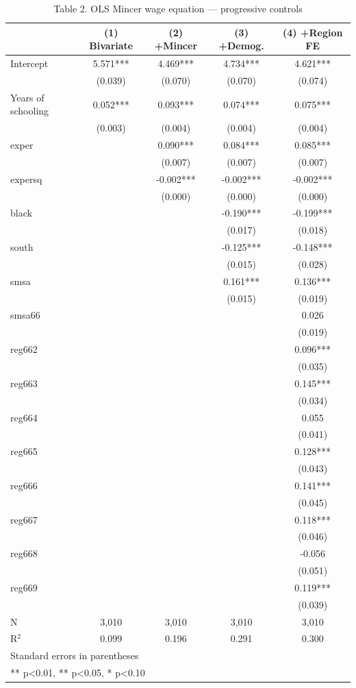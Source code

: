 \begin{table}[htbp]
\centering
\caption{Table 2. OLS Mincer wage equation — progressive controls}
\begin{tabular}{lcccc}
\hline\hline
 & (1) Bivariate & (2) +Mincer & (3) +Demog. & (4) +Region FE \\
\hline
Intercept & 5.571*** & 4.469*** & 4.734*** & 4.621*** \\
 & (0.039) & (0.070) & (0.070) & (0.074) \\
Years of schooling & 0.052*** & 0.093*** & 0.074*** & 0.075*** \\
 & (0.003) & (0.004) & (0.004) & (0.004) \\
exper &  & 0.090*** & 0.084*** & 0.085*** \\
 &  & (0.007) & (0.007) & (0.007) \\
expersq &  & -0.002*** & -0.002*** & -0.002*** \\
 &  & (0.000) & (0.000) & (0.000) \\
black &  &  & -0.190*** & -0.199*** \\
 &  &  & (0.017) & (0.018) \\
south &  &  & -0.125*** & -0.148*** \\
 &  &  & (0.015) & (0.028) \\
smsa &  &  & 0.161*** & 0.136*** \\
 &  &  & (0.015) & (0.019) \\
smsa66 &  &  &  & 0.026 \\
 &  &  &  & (0.019) \\
reg662 &  &  &  & 0.096*** \\
 &  &  &  & (0.035) \\
reg663 &  &  &  & 0.145*** \\
 &  &  &  & (0.034) \\
reg664 &  &  &  & 0.055 \\
 &  &  &  & (0.041) \\
reg665 &  &  &  & 0.128*** \\
 &  &  &  & (0.043) \\
reg666 &  &  &  & 0.141*** \\
 &  &  &  & (0.045) \\
reg667 &  &  &  & 0.118*** \\
 &  &  &  & (0.046) \\
reg668 &  &  &  & -0.056 \\
 &  &  &  & (0.051) \\
reg669 &  &  &  & 0.119*** \\
 &  &  &  & (0.039) \\
\hline
N & 3,010 & 3,010 & 3,010 & 3,010 \\
R$^2$ & 0.099 & 0.196 & 0.291 & 0.300 \\
\hline\hline
\multicolumn{5}{l}{\footnotesize Standard errors in parentheses} \\
\multicolumn{5}{l}{\footnotesize *** p<0.01, ** p<0.05, * p<0.10} \\
\end{tabular}
\end{table}